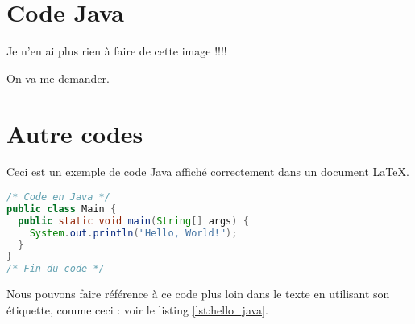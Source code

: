 \documentclass{article}
\begin{document}
\section{Code Java}

Je n'en ai plus rien à faire de cette image !!!!

On va me demander.


\section{Autre codes}

Ceci est un exemple de code Java affiché correctement dans un document LaTeX.

\begin{lstlisting}[language=Java, caption={Exemple "Hello, World!" en Java.}, label={lst:hello_java}]
/* Code en Java */
public class Main {
  public static void main(String[] args) {
    System.out.println("Hello, World!");
  }
}
/* Fin du code */
\end{lstlisting}

Nous pouvons faire référence à ce code plus loin dans le texte en utilisant son étiquette, comme ceci : voir le listing \ref{lst:hello_java}.
\end{document}
